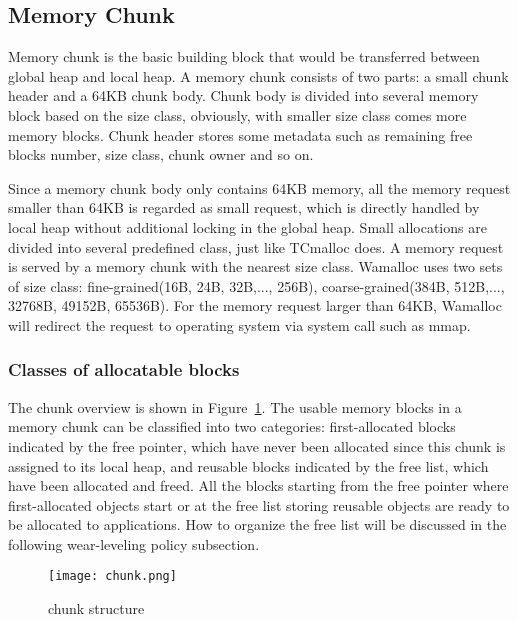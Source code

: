 \documentclass[10pt, conference, compsocconf]{IEEEtran}
\begin{document}
\subsection{Memory Chunk}

Memory chunk is the basic building block that would be transferred between global heap and local heap. 
A memory chunk consists of two parts: a small chunk header and a 64KB chunk body. 
Chunk body is divided into several memory block based on the size class,
obviously, with smaller size class comes more memory blocks. 
Chunk header stores some metadata such as remaining free blocks number, size class, chunk owner and so on.

Since a memory chunk body only contains 64KB memory, all the memory request smaller than 64KB is regarded as small request,
which is directly handled by local heap without additional locking in the global heap.
Small allocations are divided into several predefined class, just like TCmalloc does. 
A memory request is served by a memory chunk with the nearest size class. 
Wamalloc uses two sets of size class: fine-grained(16B, 24B, 32B,..., 256B), coarse-grained(384B, 512B,..., 32768B, 49152B, 65536B). 
For the memory request larger than 64KB, Wamalloc will redirect the request to operating system via system call such as mmap.

\subsubsection{Classes of allocatable blocks}
The chunk overview is shown in Figure~\ref{fig:chunk}.
The usable memory blocks in a memory chunk can be classified into two categories:
first-allocated blocks indicated by the free pointer, which have never been allocated since this chunk is assigned to its local heap,
and reusable blocks indicated by the free list, which have been allocated and freed.
All the blocks starting from the free pointer where first-allocated objects start or at the free list storing reusable objects are ready to be allocated to applications. 
How to organize the free list will be discussed in the following wear-leveling policy subsection.

\begin{figure}[h]
\centering
\texttt{[image: chunk.png]}
\caption{chunk structure}
\label{fig:chunk}
\end{figure}

\end{document}
